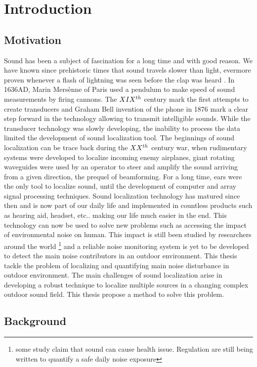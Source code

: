 \chapter{Introduction}

\section{Motivation}
Sound has been a subject of fascination for a long time and with good reason. We have known since prehistoric times that sound travels slower than light, evermore proven whenever a flash of lightning was seen before the clap was heard \cite{ampel1993history}.  In 1636AD, Marin Mersènne of Paris used a pendulum to make speed of sound measurements by firing cannons. The $\rom{19}^{th}$ century mark the first attempts to create transducers and Graham Bell invention of the phone in 1876 mark a clear step forward in the technology allowing to transmit intelligible sounds. While the transducer technology was slowly developing, the inability to process the data limited the development of sound localization tool. The beginnings of sound localization can be trace back during the $\rom{20}^{th}$ century war, when rudimentary systems were developed to localize incoming enemy airplanes, giant rotating waveguides were used by an operator to steer and amplify the sound arriving from a given direction, the prequel of beamforming. For a long time, ears were the only tool to localize sound, until the development of computer and array signal processing techniques. Sound localization technology has matured since then and is now part of our daily life and implemented in countless products such as hearing aid, headset, etc.. making our life much easier in the end. This technology can now be used to solve new problems such as accessing the impact of environmental noise on human. This impact is still been studied by researchers around the world \footnote{some study claim that sound can cause health issue. Regulation are still being written to quantify a safe daily noise exposure} and a reliable noise monitoring system is yet to be developed to detect the main noise contributors in an outdoor environment. This thesis tackle the problem of localizing and quantifying main noise disturbance in outdoor environment. The main challenges of sound localization arise in developing a robust technique to localize multiple sources in a changing complex outdoor sound field. This thesis propose a method to solve this problem.

\section{Background}

